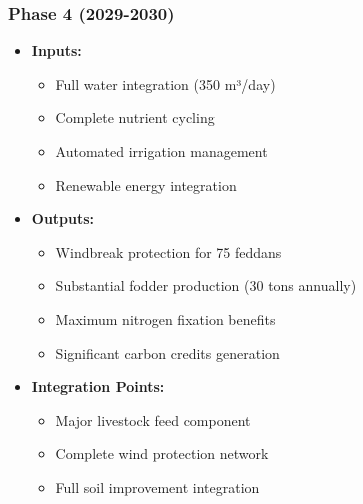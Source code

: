 \subsubsection{Phase 4 (2029-2030)}
\begin{itemize}
    \item \textbf{Inputs:}
    \begin{itemize}
        \item Full water integration (350 m³/day)
        \item Complete nutrient cycling
        \item Automated irrigation management
        \item Renewable energy integration
    \end{itemize}
    \item \textbf{Outputs:}
    \begin{itemize}
        \item Windbreak protection for 75 feddans
        \item Substantial fodder production (30 tons annually)
        \item Maximum nitrogen fixation benefits
        \item Significant carbon credits generation
    \end{itemize}
    \item \textbf{Integration Points:}
    \begin{itemize}
        \item Major livestock feed component
        \item Complete wind protection network
        \item Full soil improvement integration
    \end{itemize}
\end{itemize}

